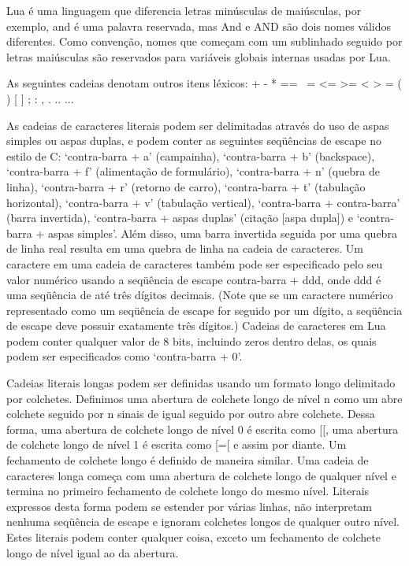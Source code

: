 \documentclass[
12pt, %
openright, %
oneside, %
a4paper, %
english, %
brazil, %
]{abntex2}
\begin{document}
Lua é uma linguagem que diferencia letras minúsculas de maiúsculas, por exemplo, and é uma palavra reservada, mas And e AND são dois nomes válidos diferentes. Como convenção, nomes que começam com um sublinhado seguido por letras maiúsculas são reservados para variáveis globais internas usadas por Lua.

As seguintes cadeias denotam outros itens léxicos:
+ - * == ~= <= >= < > = ( ) { } [ ] ; : , . .. ...

As cadeias de caracteres literais podem ser delimitadas através do uso de aspas simples ou aspas duplas, e podem conter as seguintes seqüências de escape no estilo de C: `contra-barra + a' (campainha), `contra-barra + b' (backspace), `contra-barra + f' (alimentação de formulário), `contra-barra + n' (quebra de linha), `contra-barra + r' (retorno de carro), `contra-barra + t' (tabulação horizontal), `contra-barra + v' (tabulação vertical), `contra-barra + contra-barra' (barra invertida), `contra-barra + aspas duplas' (citação [aspa dupla]) e `contra-barra + aspas simples'. Além disso, uma barra invertida seguida por uma quebra de linha real resulta em uma quebra de linha na cadeia de caracteres. Um caractere em uma cadeia de caracteres também pode ser especificado pelo seu valor numérico usando a seqüência de escape contra-barra + ddd, onde ddd é uma seqüência de até três dígitos decimais. (Note que se um caractere numérico representado como um seqüência de escape for seguido por um dígito, a seqüência de escape deve possuir exatamente três dígitos.) Cadeias de caracteres em Lua podem conter qualquer valor de 8 bits, incluindo zeros dentro delas, os quais podem ser especificados como `contra-barra + 0'.

Cadeias literais longas podem ser definidas usando um formato longo delimitado por colchetes. Definimos uma abertura de colchete longo de nível n como um abre colchete seguido por n sinais de igual seguido por outro abre colchete. Dessa forma, uma abertura de colchete longo de nível 0 é escrita como [[, uma abertura de colchete longo de nível 1 é escrita como [=[ e assim por diante. Um fechamento de colchete longo é definido de maneira similar. Uma cadeia de caracteres longa começa com uma abertura de colchete longo de qualquer nível e termina no primeiro fechamento de colchete longo do mesmo nível. Literais expressos desta forma podem se estender por várias linhas, não interpretam nenhuma seqüência de escape e ignoram colchetes longos de qualquer outro nível. Estes literais podem conter qualquer coisa, exceto um fechamento de colchete longo de nível igual ao da abertura.
\end{document}
